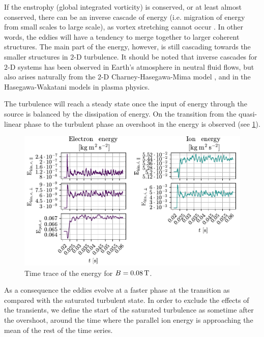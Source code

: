 If the enstrophy (global integrated vorticity) is conserved, or at least almost conserved, there can be an inverse cascade of energy (i.e. migration of energy from small scales to large scale), as vortex stretching cannot occur \cite{Fjortoft1953}.
In other words, the eddies will have a tendency to merge together to larger coherent structures.
The main part of the energy, however, is still cascading towards the smaller structures in $2$-D turbulence.
It should be noted that inverse cascades for $2$-D systems has been observed in Earth's atmosphere \cite{Smith2002} in neutral fluid flows, but also arises naturally from the $2$-D Charney-Hasegawa-Mima model \cite{Boffetta2002}, and in the Hasegawa-Wakatani \cite{Manz2009} models in plasma physics.

The turbulence will reach a steady state once the input of energy through the source is balanced by the dissipation of energy.
On the transition from the quasi-linear phase to the turbulent phase an overshoot in the energy is observed (see \cref{fig:energyTrace008}).
%
\begin{figure}[htb]
    \centering
    \includegraphics{fig/results/energyTrace/energyTraceB008}
    \caption{Time trace of the energy for $B=0.08\, \text{T}$.}
    \label{fig:energyTrace008}
\end{figure}
%
As a consequence the eddies evolve at a faster phase at the transition as compared with the saturated turbulent state.
In order to exclude the effects of the transients, we define the start of the saturated turbulence as sometime after the overshoot, around the time where the parallel ion energy is approaching the mean of the rest of the time series.

